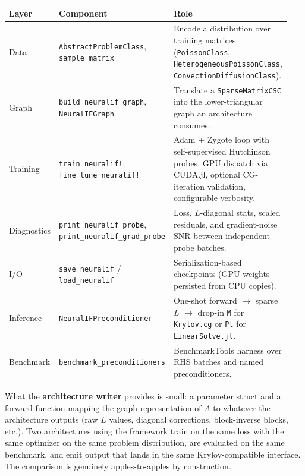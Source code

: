 \documentclass[11pt]{article}
\newcommand{\code}[1]{\texttt{\small #1}}
\begin{document}
\begin{center}
\small
\begingroup
\setlength{\tabcolsep}{4pt}
\begin{tabular}{@{}>{\raggedright\arraybackslash}p{0.12\linewidth} >{\raggedright\arraybackslash}p{0.30\linewidth} >{\raggedright\arraybackslash}p{0.52\linewidth}@{}}
\toprule
Layer & Component & Role \\
\midrule
Data         & \code{AbstractProblemClass}, \code{sample\_matrix} & Encode a distribution over training matrices (\code{PoissonClass}, \code{HeterogeneousPoissonClass}, \code{ConvectionDiffusionClass}). \\
Graph        & \code{build\_neuralif\_graph}, \code{NeuralIFGraph} & Translate a \code{SparseMatrixCSC} into the lower-triangular graph an architecture consumes. \\
Training     & \code{train\_neuralif!}, \code{fine\_tune\_neuralif!} & Adam + Zygote loop with self-supervised Hutchinson probes, GPU dispatch via CUDA.jl, optional CG-iteration validation, configurable verbosity. \\
Diagnostics  & \code{print\_neuralif\_probe}, \code{print\_neuralif\_grad\_probe} & Loss, $L$-diagonal stats, scaled residuals, and gradient-noise SNR between independent probe batches. \\
I/O          & \code{save\_neuralif} / \code{load\_neuralif} & Serialization-based checkpoints (GPU weights persisted from CPU copies). \\
Inference    & \code{NeuralIFPreconditioner} & One-shot forward $\to$ sparse $L$ $\to$ drop-in \code{M} for \code{Krylov.cg} or \code{Pl} for \code{LinearSolve.jl}. \\
Benchmark    & \code{benchmark\_preconditioners} & BenchmarkTools harness over RHS batches and named preconditioners. \\
\bottomrule
\end{tabular}
\endgroup
\end{center}

What the \textbf{architecture writer} provides is small: a parameter struct and a forward function mapping the graph representation of $A$ to whatever the architecture outputs (raw $L$ values, diagonal corrections, block-inverse blocks, etc.). Two architectures using the framework train on the same loss with the same optimizer on the same problem distribution, are evaluated on the same benchmark, and emit output that lands in the same Krylov-compatible interface. The comparison is genuinely apples-to-apples by construction.
\end{document}
